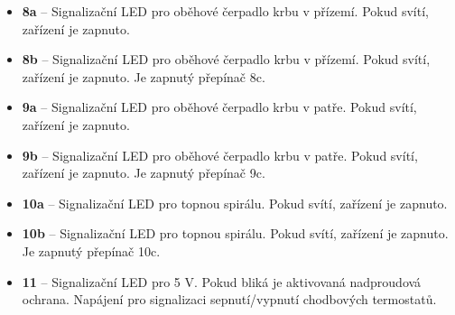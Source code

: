 \begin{Czech}
\begin{itemize}
  \item \textbf{8a} – Signalizační LED pro oběhové čerpadlo krbu v přízemí. Pokud svítí, zařízení je zapnuto.
    \item \textbf{8b} – Signalizační LED pro oběhové čerpadlo krbu v přízemí. Pokud svítí, zařízení je zapnuto. Je zapnutý přepínač 8c.
  \item \textbf{9a} – Signalizační LED pro oběhové čerpadlo krbu v patře. Pokud svítí, zařízení je zapnuto. 
    \item \textbf{9b} – Signalizační LED pro oběhové čerpadlo krbu v patře. Pokud svítí, zařízení je zapnuto. Je zapnutý přepínač 9c.
  \item \textbf{10a} – Signalizační LED pro topnou spirálu. Pokud svítí, zařízení je zapnuto.
  \item \textbf{10b} – Signalizační LED pro topnou spirálu. Pokud svítí, zařízení je zapnuto.  Je zapnutý přepínač 10c. 
    \item \textbf{11} – Signalizační LED pro 5 V. Pokud bliká je aktivovaná nadproudová ochrana. Napájení pro signalizaci sepnutí/vypnutí chodbových termostatů.
\end{itemize}
\end{Czech}


\begin{English}
\end{English}

\begin{Czech}
\end{Czech}


